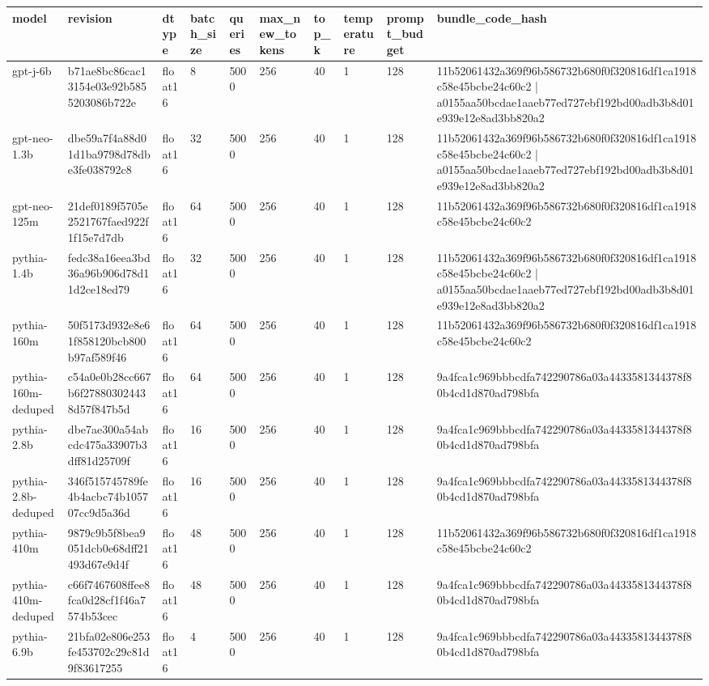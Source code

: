 \begin{tabular}{llllllllll}
\toprule
model & revision & dtype & batch\_size & queries & max\_new\_tokens & top\_k & temperature & prompt\_budget & bundle\_code\_hash \\
\midrule
gpt-j-6b & b71ae8bc86cac13154e03e92b5855203086b722e & float16 & 8 & 5000 & 256 & 40 & 1 & 128 & 11b52061432a369f96b586732b680f0f320816df1ca1918c58e45bcbe24c60c2 | a0155aa50bcdae1aaeb77ed727ebf192bd00adb3b8d01e939e12e8ad3bb820a2 \\
gpt-neo-1.3b & dbe59a7f4a88d01d1ba9798d78dbe3fe038792c8 & float16 & 32 & 5000 & 256 & 40 & 1 & 128 & 11b52061432a369f96b586732b680f0f320816df1ca1918c58e45bcbe24c60c2 | a0155aa50bcdae1aaeb77ed727ebf192bd00adb3b8d01e939e12e8ad3bb820a2 \\
gpt-neo-125m & 21def0189f5705e2521767faed922f1f15e7d7db & float16 & 64 & 5000 & 256 & 40 & 1 & 128 & 11b52061432a369f96b586732b680f0f320816df1ca1918c58e45bcbe24c60c2 \\
pythia-1.4b & fedc38a16eea3bd36a96b906d78d11d2ce18ed79 & float16 & 32 & 5000 & 256 & 40 & 1 & 128 & 11b52061432a369f96b586732b680f0f320816df1ca1918c58e45bcbe24c60c2 | a0155aa50bcdae1aaeb77ed727ebf192bd00adb3b8d01e939e12e8ad3bb820a2 \\
pythia-160m & 50f5173d932e8e61f858120bcb800b97af589f46 & float16 & 64 & 5000 & 256 & 40 & 1 & 128 & 11b52061432a369f96b586732b680f0f320816df1ca1918c58e45bcbe24c60c2 \\
pythia-160m-deduped & c54a0e0b28cc667b6f278803024438d57f847b5d & float16 & 64 & 5000 & 256 & 40 & 1 & 128 & 9a4fca1c969bbbcdfa742290786a03a4433581344378f80b4cd1d870ad798bfa \\
pythia-2.8b & dbe7ae300a54abcdc475a33907b3dff81d25709f & float16 & 16 & 5000 & 256 & 40 & 1 & 128 & 9a4fca1c969bbbcdfa742290786a03a4433581344378f80b4cd1d870ad798bfa \\
pythia-2.8b-deduped & 346f515745789fe4b4acbc74b105707cc9d5a36d & float16 & 16 & 5000 & 256 & 40 & 1 & 128 & 9a4fca1c969bbbcdfa742290786a03a4433581344378f80b4cd1d870ad798bfa \\
pythia-410m & 9879c9b5f8bea9051dcb0e68dff21493d67e9d4f & float16 & 48 & 5000 & 256 & 40 & 1 & 128 & 11b52061432a369f96b586732b680f0f320816df1ca1918c58e45bcbe24c60c2 \\
pythia-410m-deduped & c66f7467608ffee8fca0d28cf1f46a7574b53cec & float16 & 48 & 5000 & 256 & 40 & 1 & 128 & 9a4fca1c969bbbcdfa742290786a03a4433581344378f80b4cd1d870ad798bfa \\
pythia-6.9b & 21bfa02e806e253fe453702c29c81d9f83617255 & float16 & 4 & 5000 & 256 & 40 & 1 & 128 & 9a4fca1c969bbbcdfa742290786a03a4433581344378f80b4cd1d870ad798bfa \\

\end{tabular}

